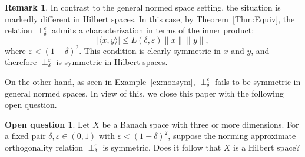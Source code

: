\documentclass[11pt, reqno]{amsart}
\theoremstyle{definition}
\newtheorem{remark}[theorem]{Remark}
\newtheorem*{question*}{Open question}
\newcommand{\nperp}{\perp_{\delta}^\varepsilon}
\begin{document}
\begin{remark}
In contrast to the general normed space setting, the situation is markedly different in Hilbert spaces. In this case, by Theorem~\ref{Thm:Equiv}, the relation $\nperp$ admits a characterization in terms of the inner product:
\[
|\langle x, y\rangle| \leq L(\delta,\varepsilon)\|x\|\|y\|,
\]
where $\varepsilon < (1-\delta)^2$. This condition is clearly symmetric in $x$ and $y$, and therefore $\nperp$ is symmetric in Hilbert spaces.
\end{remark}

\noindent On the other hand, as seen in Example~\ref{ex:nonsym}, $\nperp$ fails to be symmetric in general normed spaces. In view of this, we close this paper with the following open question.

\bigskip

\begin{question*}
Let $X$ be a Banach space with three or more dimensions. For a fixed pair $\delta,\varepsilon\in(0,1)$ with $\varepsilon<(1-\delta)^2$, suppose the norming approximate orthogonality relation $\nperp$ is symmetric. Does it follow that
$X$ is a Hilbert space?
\end{question*}










\end{document}
